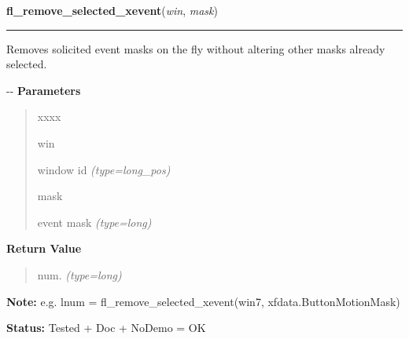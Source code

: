 \hspace{.8\funcindent}\begin{boxedminipage}{\funcwidth}

    \raggedright \textbf{fl\_remove\_selected\_xevent}(\textit{win}, \textit{mask})

    \vspace{-1.5ex}

    \rule{\textwidth}{0.5\fboxrule}
\setlength{\parskip}{2ex}

Removes solicited event masks on the fly without altering other masks
already selected.

-{}-
\setlength{\parskip}{1ex}
      \textbf{Parameters}
      \vspace{-1ex}

      \begin{quote}
        \begin{Ventry}{xxxx}

          \item[win]


window id
            {\it (type=long\_pos)}

          \item[mask]


event mask
            {\it (type=long)}

        \end{Ventry}

      \end{quote}

      \textbf{Return Value}
    \vspace{-1ex}

      \begin{quote}

num.
      {\it (type=long)}

      \end{quote}

\textbf{Note:} 
e.g. lnum = fl\_remove\_selected\_xevent(win7, xfdata.ButtonMotionMask)


\textbf{Status:} 
Tested + Doc + NoDemo = OK


    \end{boxedminipage}

    \label{xformslib:flxbasic:fl_addto_selected_xevent}

    \vspace{0.5ex}

